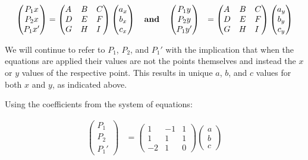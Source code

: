 \documentclass[12pt]{article}
\begin{document}
\begin{align}
\begin{pmatrix}
P_1x \\
P_2x \\
P_1x'
\end{pmatrix} \nonumber
&=
\begin{pmatrix}
A \hfill & B & C \\
D & E & F \hfill \\
G & H & I \hfill 
\end{pmatrix} \nonumber
\begin{pmatrix}
a_x \\
b_x \\
c_x
\end{pmatrix} \nonumber
\quad
\textbf{and}
\quad
\begin{pmatrix}
P_1y \\
P_2y \\
P_1y'
\end{pmatrix} \nonumber
&=
\begin{pmatrix}
A \hfill & B & C \\
D & E & F \hfill \\
G & H & I \hfill 
\end{pmatrix} \nonumber
\begin{pmatrix}
a_y \\
b_y \\
c_y
\end{pmatrix} \nonumber
\end{align}

We will continue to refer to $P_1$, $P_2$, and $P_1'$ 
with the implication that when the equations are applied
their values are not the points themselves and 
instead the $x$ or $y$ values of the respective point.
This results in unique $a$, $b$, and $c$ values for both $x$ and $y$, as indicated above.

Using the coefficients from the system of equations:

\begin{align}
\begin{pmatrix}
P_1 \\
P_2 \\
P_1'
\end{pmatrix} \nonumber
&=
\begin{pmatrix}
1 & -1 & 1 \\
1 & 1 & 1 \\
-2 & 1 & 0  
\end{pmatrix} \nonumber
\begin{pmatrix}
a \\
b \\
c
\end{pmatrix} \nonumber \\
\end{align}
\end{document}
